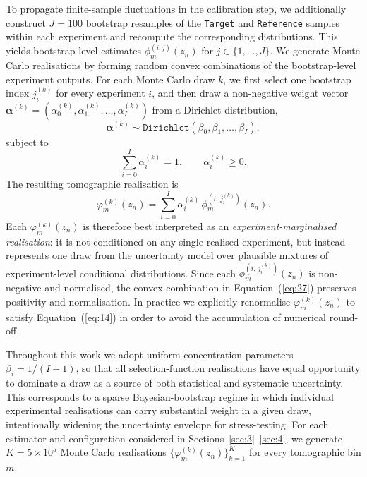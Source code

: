 To propagate finite-sample fluctuations in the calibration step, we additionally construct \(J = 100\) bootstrap resamples of the \texttt{Target} and \texttt{Reference} samples within each experiment and recompute the corresponding distributions. This yields bootstrap-level estimates \(\phi^{(i,j)}_m(z_n)\) for \(j \in \{1, \ldots, J\}\). We generate Monte Carlo realisations by forming random convex combinations of the bootstrap-level experiment outputs. For each Monte Carlo draw \(k\), we first select one bootstrap index \(j^{(k)}_i\) for every experiment \(i\), and then draw a non-negative weight vector \(\boldsymbol{\alpha}^{(k)} = (\alpha^{(k)}_0, \alpha^{(k)}_1, \ldots, \alpha^{(k)}_I)\) from a Dirichlet distribution,
\begin{equation} \label{eq:25}
    \boldsymbol{\alpha}^{(k)} \sim \texttt{Dirichlet}\!\left(\beta_0, \beta_1, \ldots, \beta_I\right),
\end{equation}
subject to
\begin{equation} \label{eq:26}
    \sum_{i=0}^{I} \alpha^{(k)}_i = 1, \qquad \alpha^{(k)}_i \ge 0.
\end{equation}
The resulting tomographic realisation is
\begin{equation} \label{eq:27}
    \varphi^{(k)}_m(z_n) = \sum_{i=0}^{I} \alpha^{(k)}_i \, \phi^{(i,\,j_i^{(k)})}_m(z_n).
\end{equation}
Each \(\varphi^{(k)}_m(z_n)\) is therefore best interpreted as an \emph{experiment-marginalised realisation}: it is not conditioned on any single realised experiment, but instead represents one draw from the uncertainty model over plausible mixtures of experiment-level conditional distributions. Since each \(\phi^{(i,\,j_i^{(k)})}_m(z_n)\) is non-negative and normalised, the convex combination in Equation~(\ref{eq:27}) preserves positivity and normalisation. In practice we explicitly renormalise \(\varphi^{(k)}_m(z_n)\) to satisfy Equation~(\ref{eq:14}) in order to avoid the accumulation of numerical round-off.

Throughout this work we adopt uniform concentration parameters \(\beta_i = 1/(I+1)\), so that all selection-function realisations have equal opportunity to dominate a draw as a source of both statistical and systematic uncertainty. This corresponds to a sparse Bayesian-bootstrap regime in which individual experimental realisations can carry substantial weight in a given draw, intentionally widening the uncertainty envelope for stress-testing. For each estimator and configuration considered in Sections~\ref{sec:3}--\ref{sec:4}, we generate \(K = 5\times 10^5\) Monte Carlo realisations \(\{ \varphi^{(k)}_m(z_n) \}_{k=1}^{K}\) for every tomographic bin \(m\).

